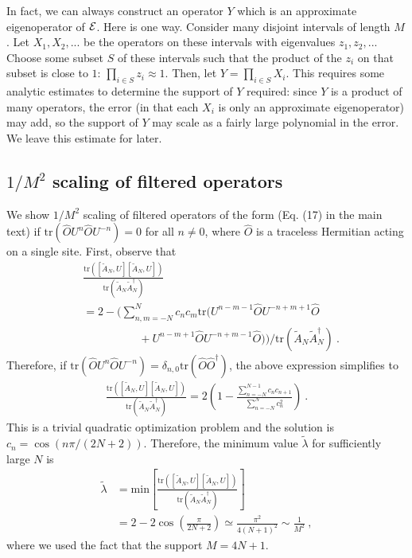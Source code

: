 \documentclass[twocolumn,superscriptaddress, prl,showpacs]{revtex4-1}
\begin{document}
In fact, we can always construct an operator $Y$ which is an approximate eigenoperator of ${\cal E}$.  Here is one way.  Consider many disjoint intervals of length $M$.  Let $X_1,X_2,...$ be the operators on these intervals with eigenvalues $z_1,z_2,...$  Choose some subset $S$ of these intervals such that the product of the $z_i$ on that subset is close to $1$: $\prod_{i \in S} z_i \approx 1$.  Then, let $Y=\prod_{i \in S} X_i$.  This requires some analytic estimates to determine the support of $Y$ required: since $Y$ is a product of many operators, the error (in that each $X_i$ is only an approximate eigenoperator) may add, so the support of $Y$ may scale as a fairly large polynomial in the error.  We leave this estimate for later.

\subsection{$1/M^2$ scaling of filtered operators}
We show $1/M^2$ scaling of filtered operators of the form (Eq. (17) in the main text) if $\mathrm{tr}(\hat{O}U^n \hat{O}U^{-n}) = 0$ for all $n\neq 0$,
where $\hat{O}$ is a traceless Hermitian acting on a single site.
First, observe that
\begin{align}
& \frac{\mathrm{tr}([\tilde{A}_N,U][\tilde{A}_N,U])}{\mathrm{tr}(\tilde{A}_N\tilde{A}_N^\dag)} \nonumber\\
&=2 - \bigg(\sum_{n,m = -N}^{N}c_n c_m \mathrm{tr}(U^{n-m-1}\hat{O}U^{-n+m+1}\hat{O} \nonumber\\
&\quad\quad\quad\quad\quad + U^{n-m+1}\hat{O}U^{-n+m-1}\hat{O})\bigg)/\mathrm{tr}(\tilde{A}_N\tilde{A}_N^\dag) ~.
\end{align}
Therefore, if $\mathrm{tr}(\hat{O}U^n \hat{O}U^{-n}) = \delta_{n,0}\mathrm{tr}(\hat{O}\hat{O}^\dag)$,
the above expression simplifies to
\begin{align}
\frac{\mathrm{tr}([\tilde{A}_N,U][\tilde{A}_N,U])}{\mathrm{tr}(\tilde{A}_N\tilde{A}_N^\dag)}=2\left(1 - \frac{\sum_{n=-N}^{N-1}c_n c_{n+1}}{\sum_{n=-N}^N c_n^2}\right) ~.
\end{align}
This is a trivial quadratic optimization problem and the solution is $c_n = \cos(n\pi/(2N+2))$.
Therefore, the minimum value $\tilde{\lambda}$ for sufficiently large $N$ is
\begin{align}
\tilde{\lambda} &= \mathrm{min}\left[\frac{\mathrm{tr}([\tilde{A}_N,U][\tilde{A}_N,U])}{\mathrm{tr}(\tilde{A}_N\tilde{A}_N^\dag)} \right] \nonumber\\
&= 2 - 2\cos\left(\frac{\pi}{2N+2}\right) \simeq \frac{\pi^2}{4(N+1)^2} \sim \frac{1}{M^2} ~,
\end{align}
where we used the fact that the support $M = 4N +1 $.
\end{document}
